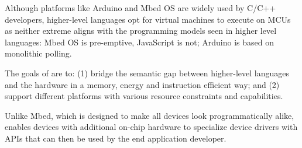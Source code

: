 Although platforms like Arduino and Mbed OS are widely used by C/C++ developers, 
higher-level languages opt for virtual machines to execute on MCUs 
as neither extreme aligns with the programming models seen in higher level languages: 
Mbed OS is pre-emptive, JavaScript is not; Arduino is based on monolithic polling. 

The goals of \CO are to: (1) bridge the semantic gap between 
higher-level languages and the hardware in a memory, energy and instruction 
efficient way; and (2) support different platforms with various
resource constraints and capabilities.

Unlike Mbed, which is designed to make all devices look programmatically alike,
\CO enables devices with additional on-chip hardware to specialize device drivers 
with APIs that can then be used by the end application developer.


